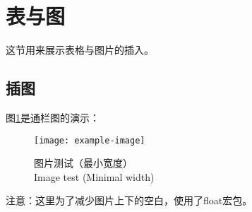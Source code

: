 \section{表与图}这节用来展示表格与图片的插入。

\subsection{插图}
图\ref{figure1}是通栏图的演示：
\begin{figure}[hbtp]
    \centering
    \texttt{[image: example-image]}
    \caption{图片测试（最小宽度）\\Image test (Minimal width)}
    \label{figure1}
\end{figure}
\par 注意：这里为了减少图片上下的空白，使用了float宏包。



